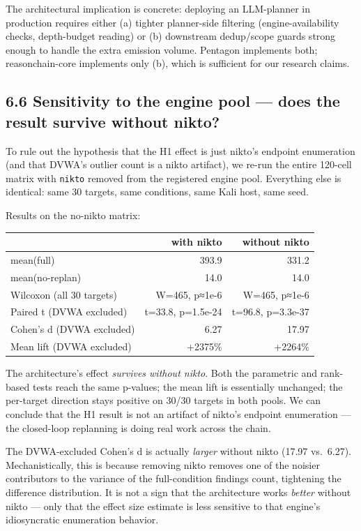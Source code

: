 \documentclass[
]{article}
\newcounter{none} %
\begin{document}
The architectural implication is concrete: deploying an LLM-planner in
production requires either (a) tighter planner-side filtering
(engine-availability checks, depth-budget reading) or (b) downstream
dedup/scope guards strong enough to handle the extra emission volume.
Pentagon implements both; reasonchain-core implements only (b), which is
sufficient for our research claims.

\subsection{6.6 Sensitivity to the engine pool --- does the result
survive without
nikto?}\label{sensitivity-to-the-engine-pool-does-the-result-survive-without-nikto}

To rule out the hypothesis that the H1 effect is just nikto's endpoint
enumeration (and that DVWA's outlier count is a nikto artifact), we
re-run the entire 120-cell matrix with \texttt{nikto} removed from the
registered engine pool. Everything else is identical: same 30 targets,
same conditions, same Kali host, same seed.

Results on the no-nikto matrix:

{\def\LTcaptype{none} %
\begin{longtable}[]{@{}lrr@{}}
\toprule\noalign{}
& with nikto & without nikto \\
\midrule\noalign{}
\endhead
\bottomrule\noalign{}
\endlastfoot
mean(full) & 393.9 & 331.2 \\
mean(no-replan) & 14.0 & 14.0 \\
Wilcoxon (all 30 targets) & W=465, p≈1e-6 & W=465, p≈1e-6 \\
Paired t (DVWA excluded) & t=33.8, p=1.5e-24 & t=96.8, p=3.3e-37 \\
Cohen's d (DVWA excluded) & 6.27 & 17.97 \\
Mean lift (DVWA excluded) & +2375\% & +2264\% \\
\end{longtable}
}

The architecture's effect \emph{survives without nikto}. Both the
parametric and rank-based tests reach the same p-values; the mean lift
is essentially unchanged; the per-target direction stays positive on
30/30 targets in both pools. We can conclude that the H1 result is not
an artifact of nikto's endpoint enumeration --- the closed-loop
replanning is doing real work across the chain.

The DVWA-excluded Cohen's d is actually \emph{larger} without nikto
(17.97 vs.~6.27). Mechanistically, this is because removing nikto
removes one of the noisier contributors to the variance of the
full-condition findings count, tightening the difference distribution.
It is not a sign that the architecture works \emph{better} without nikto
--- only that the effect size estimate is less sensitive to that
engine's idiosyncratic enumeration behavior.
\end{document}

